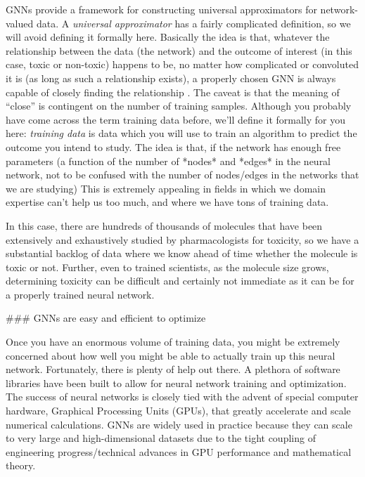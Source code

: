 GNNs provide a framework for constructing universal approximators for network-valued data. A \textit{universal approximator} has a fairly complicated definition, so we will avoid defining it formally here. Basically the idea is that, whatever the relationship between the data (the network) and the outcome of interest (in this case, toxic or non-toxic) happens to be, no matter how complicated or convoluted it is (as long as such a relationship exists), a properly chosen GNN is always capable of closely finding the relationship \cite{Scarselli2008Dec}. The caveat is that the meaning of ``close'' is contingent on the number of training samples. Although you probably have come across the term training data before, we'll define it formally for you here: \textit{training data} is data which you will use to train an algorithm to predict the outcome you intend to study. The idea is that, if the network has enough free parameters (a function of the number of *nodes* and *edges* in the neural network, not to be confused with the number of nodes/edges in the networks that we are studying)  This is extremely appealing in fields in which we domain expertise can't help us too much, and where we have tons of training data. 

In this case, there are hundreds of thousands of molecules that have been extensively and exhaustively studied by pharmacologists for toxicity, so we have a substantial backlog of data where we know ahead of time whether the molecule is toxic or not. Further, even to trained scientists, as the molecule size grows, determining toxicity can be difficult and certainly not immediate as it can be for a properly trained neural network.

### GNNs are easy and efficient to optimize

Once you have an enormous volume of training data, you might be extremely concerned about how well you might be able to actually train up this neural network. Fortunately, there is plenty of help out there. A plethora of software libraries have been built to allow for neural network training and optimization. The success of neural networks is closely tied with the advent of special computer hardware, Graphical Processing Units (GPUs), that greatly accelerate and scale numerical calculations. GNNs are widely used in practice because they can scale to very large and high-dimensional datasets due to the tight coupling of engineering progress/technical advances in GPU performance and mathematical theory.

\begin{lstlisting}[style=python]

\end{lstlisting}




